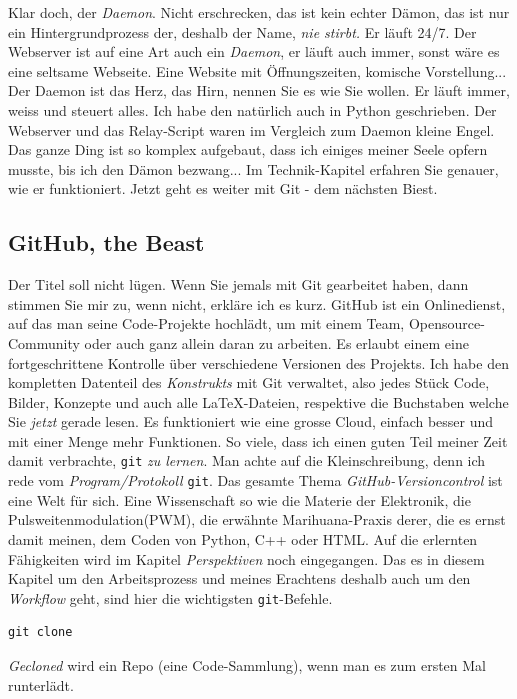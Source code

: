 \documentclass[12pt,titlepage,a4paper]{article}
\begin{document}
Klar doch, der \textit{Daemon}. Nicht erschrecken, das ist kein echter Dämon, das ist nur ein Hintergrundprozess der, deshalb der Name, \textit{nie stirbt.} Er läuft 24/7. Der Webserver ist auf eine Art auch ein \textit{Daemon}, er läuft auch immer, sonst wäre es eine seltsame Webseite. Eine Website mit Öffnungszeiten, komische Vorstellung... Der Daemon ist das Herz, das Hirn, nennen Sie es wie Sie wollen. Er läuft immer, weiss und steuert alles. Ich habe den natürlich auch in Python geschrieben. Der Webserver und das Relay-Script waren im Vergleich zum Daemon kleine Engel. Das ganze Ding ist so komplex aufgebaut, dass ich einiges meiner Seele opfern musste, bis ich den Dämon bezwang... Im Technik-Kapitel erfahren Sie genauer, wie er funktioniert. Jetzt geht es weiter mit Git - dem nächsten Biest.


\subsection{GitHub, the Beast}
Der Titel soll nicht lügen. Wenn Sie jemals mit Git gearbeitet haben, dann stimmen Sie mir zu, wenn nicht, erkläre ich es kurz. GitHub ist ein Onlinedienst, auf das man seine Code-Projekte hochlädt, um mit einem Team, Opensource-Community oder auch ganz allein daran zu arbeiten. Es erlaubt einem eine fortgeschrittene Kontrolle über verschiedene Versionen des Projekts. Ich habe den kompletten Datenteil des \textit{Konstrukts} mit Git verwaltet, also jedes Stück Code, Bilder, Konzepte und auch alle LaTeX-Dateien, respektive die Buchstaben welche Sie \textit{jetzt} gerade lesen. Es funktioniert wie eine grosse Cloud, einfach besser und mit einer Menge mehr Funktionen. So viele, dass ich einen guten Teil meiner Zeit damit verbrachte, \verb^git^ \textit{zu lernen}. Man achte auf die Kleinschreibung, denn ich rede vom \textit{Program/Protokoll} \verb?git?. Das gesamte Thema \textit{GitHub-Versioncontrol} ist eine Welt für sich. Eine Wissenschaft so wie die Materie der Elektronik, die Pulsweitenmodulation(PWM), die erwähnte Marihuana-Praxis derer, die es ernst damit meinen, dem Coden von Python, C++ oder HTML. Auf die erlernten Fähigkeiten wird im Kapitel \textit{Perspektiven} noch eingegangen. Das es in diesem Kapitel um den Arbeitsprozess und meines Erachtens deshalb auch um den \textit{Workflow} geht, sind hier die wichtigsten \verb?git?-Befehle.
\begin{verbatim}
git clone
\end{verbatim}
\textit{Gecloned} wird ein Repo (eine Code-Sammlung), wenn man es zum ersten Mal runterlädt.
\end{document}
